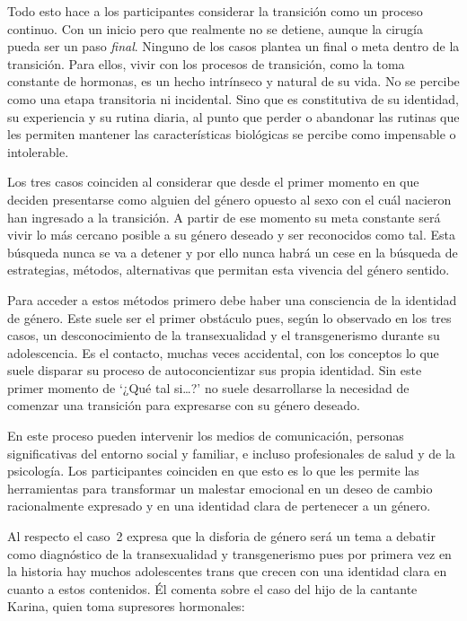 Todo esto hace a los participantes considerar la transición como un proceso
continuo. Con un inicio pero que realmente no se detiene, aunque la cirugía
pueda ser un paso \emph{final}. Ninguno de los casos plantea un final o meta
dentro de la transición. Para ellos, vivir con los procesos de transición, como
la toma constante de hormonas, es un hecho intrínseco y natural de su vida. No
se percibe como una etapa transitoria ni incidental. Sino que es constitutiva de
su identidad, su experiencia y su rutina diaria, al punto que perder o abandonar
las rutinas que les permiten mantener las características biológicas se percibe
como impensable o intolerable.

Los tres casos coinciden al considerar que desde el primer momento en que
deciden presentarse como alguien del género opuesto al sexo con el cuál nacieron
han ingresado a la transición. A partir de ese momento su meta constante será
vivir lo más cercano posible a su género deseado y ser reconocidos como tal.
Esta búsqueda nunca se va a detener y por ello nunca habrá un cese en la
búsqueda de estrategias, métodos, alternativas que permitan esta vivencia del
género sentido.

Para acceder a estos métodos primero debe haber una consciencia de la identidad
de género. Este suele ser el primer obstáculo pues, según lo observado en los tres casos, un
desconocimiento de la transexualidad y el transgenerismo durante su
adolescencia. Es el contacto, muchas veces accidental, con los conceptos lo que
suele disparar su proceso de autoconcientizar sus propia identidad. Sin este
primer momento de ‘¿Qué tal si…?’ no suele desarrollarse la necesidad de
comenzar una transición para expresarse con su género deseado.

En este proceso pueden intervenir los medios de comunicación, personas
significativas del entorno social y familiar, e incluso profesionales de salud y
de la psicología. Los participantes coinciden en que esto es lo que les permite
las herramientas para transformar un malestar emocional en un deseo de cambio
racionalmente expresado y en una identidad clara de pertenecer a un género.

Al respecto el caso~2 expresa que la disforia de género será un tema a debatir
como diagnóstico de la transexualidad y transgenerismo pues por primera vez en
la historia hay muchos adolescentes trans que crecen con una identidad clara en
cuanto a estos contenidos. Él comenta sobre el caso del hijo de la cantante
Karina, quien toma supresores hormonales:

